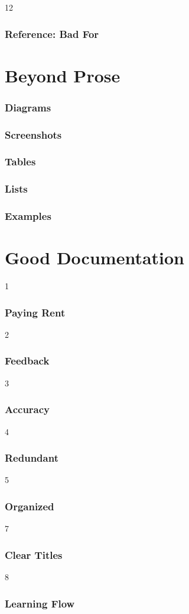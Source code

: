 12
\begin{frame}
\frametitle{Reference: Bad For}
\end{frame}

\section{Beyond Prose}


\begin{frame}
\frametitle{Diagrams}
\end{frame}

\begin{frame}
\frametitle{Screenshots}
\end{frame}

\begin{frame}
\frametitle{Tables}
\end{frame}

\begin{frame}
\frametitle{Lists}
\end{frame}

\begin{frame}
\frametitle{Examples}
\end{frame}

\section{Good Documentation}

1
\begin{frame}
\frametitle{Paying Rent}
\end{frame}

2
\begin{frame}
\frametitle{Feedback}
\end{frame}

3
\begin{frame}
\frametitle{Accuracy}
\end{frame}

4
\begin{frame}
\frametitle{Redundant}
\end{frame}

5
\begin{frame}
\frametitle{Organized}
\end{frame}

7
\begin{frame}
\frametitle{Clear Titles}
\end{frame}

8
\begin{frame}
\frametitle{Learning Flow}
\end{frame}

